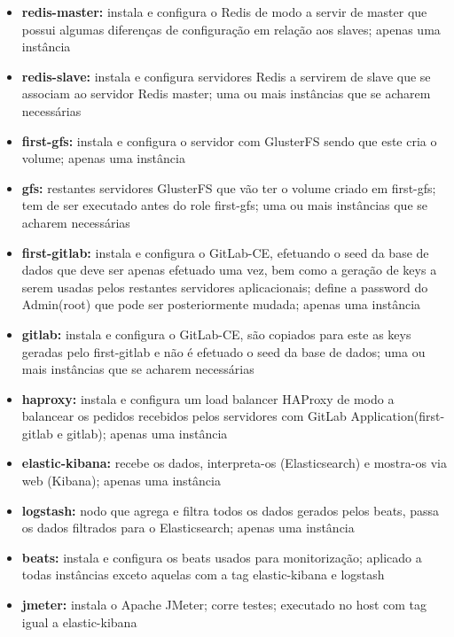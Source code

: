 \documentclass{article}
\begin{document}
\begin{itemize}
\begin{itemize}
        	\item \textbf{redis-master:} instala e configura o Redis de modo a servir de master que possui algumas diferenças de configuração em relação aos slaves; apenas uma instância
        	\item \textbf{redis-slave:} instala e configura servidores Redis a servirem de slave que se associam ao servidor Redis master; uma ou mais instâncias que se acharem necessárias
        	\item \textbf{first-gfs:} instala e configura o servidor com GlusterFS sendo que este cria o volume; apenas uma instância
        	\item \textbf{gfs:} restantes servidores GlusterFS que vão ter o volume criado em first-gfs; tem de ser executado antes do role first-gfs; uma ou mais instâncias que se acharem necessárias
        	\item \textbf{first-gitlab:} instala e configura o GitLab-CE, efetuando o seed da base de dados que deve ser apenas efetuado uma vez, bem como a geração de keys a serem usadas pelos restantes servidores aplicacionais; define a password do Admin(root) que pode ser posteriormente mudada; apenas uma instância
        	\item \textbf{gitlab:} instala e configura o GitLab-CE, são copiados para este as keys geradas pelo first-gitlab e não é efetuado o seed da base de dados; uma ou mais instâncias que se acharem necessárias
        	\item \textbf{haproxy:} instala e configura um load balancer HAProxy de modo a balancear os pedidos recebidos pelos servidores com GitLab Application(first-gitlab e gitlab); apenas uma instância
        	\item \textbf{elastic-kibana:} recebe os dados, interpreta-os (Elasticsearch) e mostra-os via web (Kibana); apenas uma instância
        	\item \textbf{logstash:} nodo que agrega e filtra todos os dados gerados pelos beats, passa os dados filtrados para o Elasticsearch; apenas uma instância
        	\item \textbf{beats:} instala e configura os beats usados para monitorização; aplicado a todas instâncias exceto aquelas com a tag elastic-kibana e logstash
        	\item \textbf{jmeter:} instala o Apache JMeter; corre testes; executado no host com tag igual a elastic-kibana
        \end{itemize}
\end{itemize}
\end{document}
